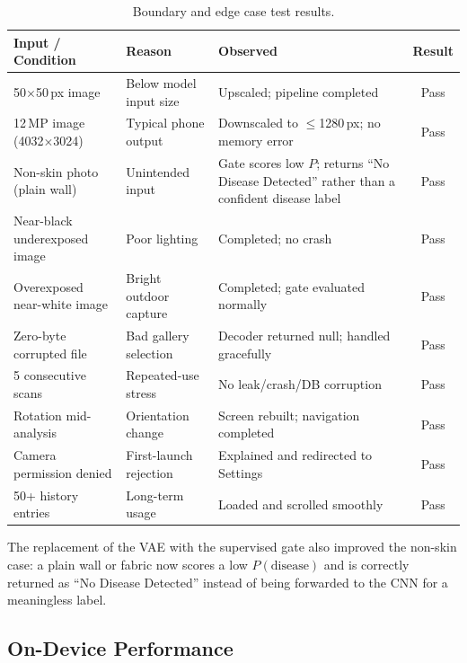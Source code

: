 \begin{table}[H]
\centering
\caption{Boundary and edge case test results.}
\label{tab:edge_cases}
\begin{tabular}{|p{4cm}|p{4cm}|p{4cm}|c|}
\hline
\textbf{Input / Condition} & \textbf{Reason} & \textbf{Observed} & \textbf{Result} \\ \hline
50$\times$50\,px image & Below model input size & Upscaled; pipeline completed & Pass \\ \hline
12\,MP image (4032$\times$3024) & Typical phone output & Downscaled to $\le$1280\,px; no memory error & Pass \\ \hline
Non-skin photo (plain wall) & Unintended input & Gate scores low $P$; returns ``No Disease Detected'' rather than a confident disease label & Pass \\ \hline
Near-black underexposed image & Poor lighting & Completed; no crash & Pass \\ \hline
Overexposed near-white image & Bright outdoor capture & Completed; gate evaluated normally & Pass \\ \hline
Zero-byte corrupted file & Bad gallery selection & Decoder returned null; handled gracefully & Pass \\ \hline
5 consecutive scans & Repeated-use stress & No leak/crash/DB corruption & Pass \\ \hline
Rotation mid-analysis & Orientation change & Screen rebuilt; navigation completed & Pass \\ \hline
Camera permission denied & First-launch rejection & Explained and redirected to Settings & Pass \\ \hline
50+ history entries & Long-term usage & Loaded and scrolled smoothly & Pass \\ \hline
\end{tabular}
\end{table}

\noindent The replacement of the VAE with the supervised gate also improved the
non-skin case: a plain wall or fabric now scores a low $P(\text{disease})$ and is
correctly returned as ``No Disease Detected'' instead of being forwarded to the
CNN for a meaningless label.

\subsection{On-Device Performance}

